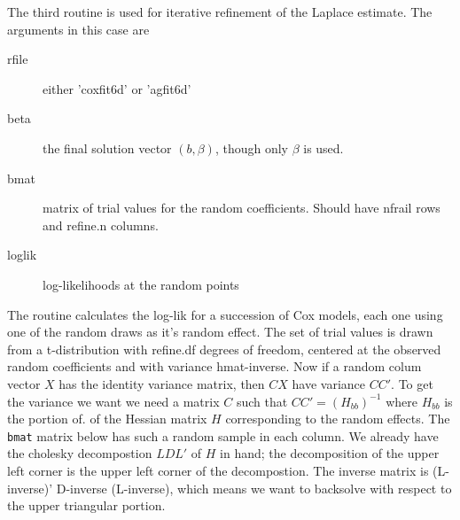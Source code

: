 \documentclass{article}
\begin{document}
The third routine is used for iterative refinement of the Laplace
estimate. The arguments in this case are
\begin{description}
  \item[rfile] either 'coxfit6d' or 'agfit6d'
  \item[beta] the final solution vector $(b, \beta)$, though only $\beta$
    is used.
  \item[bmat] matrix of trial values for the random coefficients.
    Should have nfrail rows and refine.n columns.
  \item[loglik] log-likelihoods at the random points
\end{description}

The routine calculates the log-lik for a succession of Cox models, each
one using one of the random draws as it's random effect.       %
The set of trial values is drawn from a t-distribution with
refine.df degrees of freedom, centered at the observed
random coefficients and with variance hmat-inverse.
Now if a random colum vector $X$ has the identity variance
matrix, then $CX$ have variance $CC'$.    %
To get the variance we want we need a matrix
$C$ such that 
$CC' = (H_{bb})^{-1}$  where $H_{bb}$ is the portion of.%
of the Hessian matrix $H$ corresponding to the random effects.
The \Verb!bmat! matrix below has such a random sample in each column.
We already have the cholesky decompostion $LDL'$ of $H$ in hand; %
the decomposition of the upper left corner is the upper left
corner of the decompostion.
The inverse matrix is (L-inverse)' D-inverse (L-inverse), which %
means we want to backsolve with respect to the upper triangular
portion. 
\end{document}
